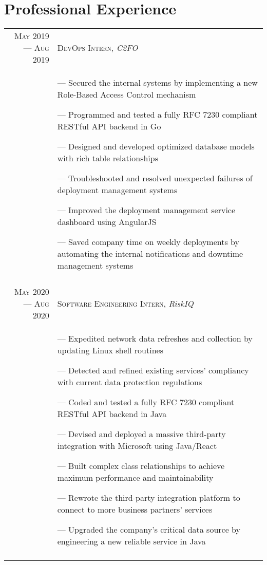 \documentclass[a4paper, 10pt]{article}
\begin{document}
\section{Professional Experience}
\begin{tabular}{r|p{12cm}}
	
	\textsc{May 2019 --- Aug 2019} & \textsc{DevOps Intern}, \emph{C2FO}                         \\&\footnotesize{
		--- Secured the internal systems by implementing a new Role-Based Access Control mechanism

		--- Programmed and tested a fully RFC 7230 compliant RESTful API backend in Go

		--- Designed and developed optimized database models with rich table relationships

		--- Troubleshooted and resolved unexpected failures of deployment management systems

		--- Improved the deployment management service dashboard using AngularJS

		--- Saved company time on weekly deployments by automating the internal notifications and downtime management systems
	}                                                                                                                            \\\multicolumn{2}{c}{}\\

	\textsc{May 2020 --- Aug 2020} & \textsc{Software Engineering Intern}, \emph{RiskIQ}                      \\&\footnotesize{
		--- Expedited network data refreshes and collection by updating Linux shell routines

		--- Detected and refined existing services' compliancy with current data protection regulations

		--- Coded and tested a fully RFC 7230 compliant RESTful API backend in Java

		--- Devised and deployed a massive third-party integration with Microsoft using Java/React

		--- Built complex class relationships to achieve maximum performance and maintainability

		--- Rewrote the third-party integration platform to connect to more business partners' services

		--- Upgraded the company's critical data source by engineering a new reliable service in Java
	}                                                                                                                            \\\multicolumn{2}{c}{}\\
	

\end{tabular}
\end{document}
